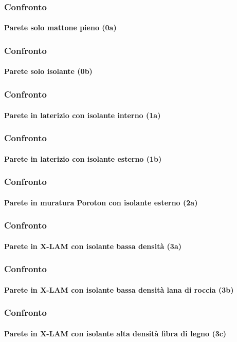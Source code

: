 \documentclass[aspectratio=141,10pt]{beamer}
\begin{document}
\begin{frame}
    \frametitle{Confronto}
    \framesubtitle{Parete solo mattone pieno (0a)}
    
\end{frame}
\begin{frame}
    \frametitle{Confronto}
    \framesubtitle{Parete solo isolante (0b)}
    
\end{frame}
\begin{frame}
    \frametitle{Confronto}
    \framesubtitle{Parete in laterizio con isolante interno (1a)}
    
\end{frame}
\begin{frame}
    \frametitle{Confronto}
    \framesubtitle{Parete in laterizio con isolante esterno (1b)}
    
\end{frame}
\begin{frame}
    \frametitle{Confronto}
    \framesubtitle{Parete in muratura Poroton con isolante esterno (2a)}
    
\end{frame}
\begin{frame}
    \frametitle{Confronto}
    \framesubtitle{Parete in X-LAM con isolante bassa densità (3a)}
    
\end{frame}
\begin{frame}
    \frametitle{Confronto}
    \framesubtitle{Parete in X-LAM con isolante bassa densità lana di roccia (3b)}
    
\end{frame}
\begin{frame}
    \frametitle{Confronto}
    \framesubtitle{Parete in X-LAM con isolante alta densità fibra di legno (3c)}
    
\end{frame}
\end{document}
